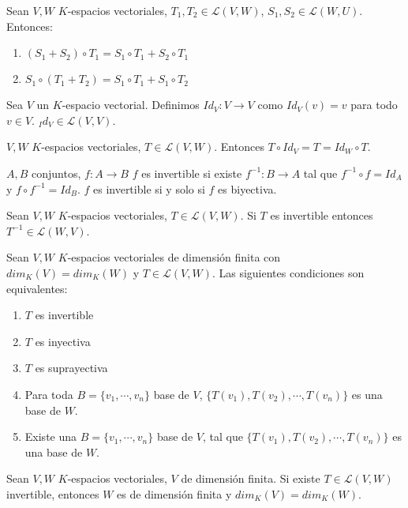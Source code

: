 \begin{proposition}{}{}
    Sean $V,W$ $K$-espacios vectoriales, $T_1, T_2 \in \mathcal{L}(V,W)$, $S_1, S_2 \in \mathcal{L}(W,U)$. Entonces:
    \begin{enumerate}
        \item $(S_1 + S_2) \circ T_1 = S_1 \circ T_1 + S_2 \circ T_1$
        \item $S_1 \circ (T_1 + T_2) = S_1 \circ T_1 + S_1 \circ T_2$
    \end{enumerate}
\end{proposition}
\begin{obs}{}{}
    Sea $V$ un $K$-espacio vectorial. Definimos $Id_V: V \rightarrow V$ como $Id_V(v) = v$ para todo $v \in V$. $_Id_V \in \mathcal{L}(V,V)$.
\end{obs}
\begin{obs}{}{}
    $V,W$ $K$-espacios vectoriales, $T \in \mathcal{L}(V,W)$. Entonces $T \circ Id_V = T = Id_W \circ T$.
\end{obs}
\begin{definition}{}{}
    $A,B$ conjuntos, $f: A \rightarrow B$ $f$ es invertible si existe $f^{-1}: B \rightarrow A$ tal que $f^{-1} \circ f = Id_A$ y $f \circ f^{-1} = Id_B$.
    $f$ es invertible si y solo si $f$ es biyectiva.
\end{definition}
\begin{proposition}{}{}
    Sean $V, W$ $K$-espacios vectoriales, $T \in \mathcal{L}(V,W)$. Si $T$ es invertible entonces $T^{-1} \in \mathcal{L}(W,V)$.
\end{proposition}
\begin{theorem}{}{}
    Sean $V, W$ $K$-espacios vectoriales de dimensión finita con $dim_K(V) = dim_K(W)$ y $T \in \mathcal{L}(V,W)$. Las siguientes condiciones son equivalentes:
    \begin{enumerate}
        \item $T$ es invertible
        \item $T$ es inyectiva
        \item $T$ es suprayectiva
        \item Para toda $B = \{v_1, \cdots, v_n\}$ base de $V$, $\{T(v_1), T(v_2), \cdots, T(v_n)\}$ es una base de $W$.
        \item Existe una $B = \{v_1, \cdots, v_n\}$ base de $V$, tal que $\{T(v_1), T(v_2), \cdots, T(v_n)\}$ es una base de $W$.
    \end{enumerate}
\end{theorem}
\begin{theorem}{}{}
    Sean $V, W$ $K$-espacios vectoriales, $V$ de dimensión finita. Si existe $T \in \mathcal{L}(V,W)$ invertible, entonces $W$ es de dimensión finita y $dim_K(V) = dim_K(W)$.
\end{theorem}
